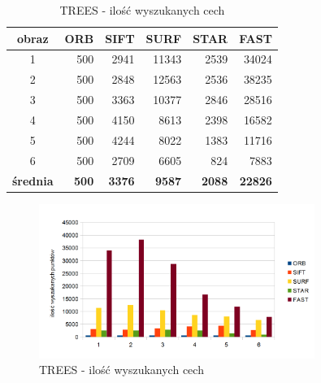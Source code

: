 \begin{table}[htbp]
  \centering
  \caption{TREES - ilość wyszukanych cech}
    \begin{tabular}{|c|r|r|r|r|r|}\hline
    
    obraz & \textbf{ORB} & \textbf{SIFT} & \textbf{SURF} & \textbf{STAR} & \textbf{FAST} \\\hline
    
   
    1 & 500 & 2941 & 11343 & 2539 & 34024 \\
    2 & 500 & 2848 & 12563 & 2536 & 38235 \\
    3 & 500 & 3363 & 10377 & 2846 & 28516 \\
    4 & 500 & 4150 & 8613 & 2398 & 16582 \\
    5 & 500 & 4244 & 8022 & 1383 & 11716 \\
    6 & 500 & 2709 & 6605 & 824 & 7883 \\\hline
    \textbf{średnia} & \textbf{500} & \textbf{3376} & \textbf{9587} & \textbf{2088} & \textbf{22826} \\
   \hline
    \end{tabular}%
  \label{tab:trees_f1}%
\end{table}%


\begin{figure}
\centering
\includegraphics[width=0.8\textwidth]{pict/mikolajczyk/trees/F1.png}
\caption{TREES - ilość wyszukanych cech}
\label{fig:trees_f1}
\end{figure}


